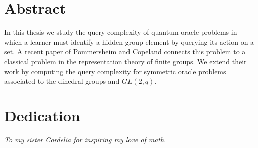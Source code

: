     \tableofcontents

    \chapter*{Abstract}
    In this thesis we study the query complexity of quantum oracle problems in which a learner must identify a 
    hidden group element by querying its action on a set. A recent paper of Pommersheim and Copeland connects this 
    problem to a classical problem in the representation theory of finite groups. We extend their work by computing 
    the query complexity for symmetric oracle problems associated to the dihedral groups and $GL(2,q)$.
    
    \chapter*{Dedication}
    \emph{To my sister Cordelia for inspiring my love of math}.
  \mainmatter %
  \pagestyle{fancyplain} %

